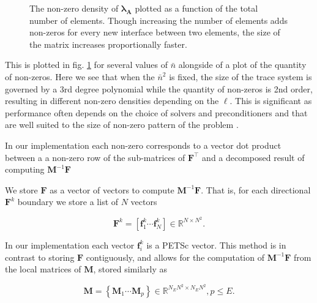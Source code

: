 \begin{figure}
	\centering
	\begin{subfigure}{\columnwidth}
		\centering
		
		
	\end{subfigure}
	\bigskip
	\begin{subfigure}{\columnwidth}
		\centering
		
	\end{subfigure}
	\caption{The non-zero density of $\symbf{\lambda}_{\textbf{A}}$ 
	plotted as a function of the total number of elements. Though increasing the number of elements adds non-zeros for every new interface between two elements, the size of the matrix increases proportionally faster.}
	\label{fig:nz_density} 
\end{figure}

\noindent
This is plotted in fig. \ref{fig:nz_density} for several values of $\bar{n}$ alongside of a plot of the quantity of non-zeros. Here we see that when the $\bar{n}^2$ is fixed, the size of the trace system is governed by a 3rd degree polynomial while the quantity of non-zeros is 2nd order, resulting in different non-zero densities depending on the $\ell$. This is significant as performance often depends on the choice of solvers and preconditioners and that are well suited to the size of non-zero pattern of the problem \citep{bollhofer2020state}. %

In our implementation each non-zero corresponds to a vector dot product between a a non-zero row of the sub-matrices of $\textbf{F}^{\intercal}$ and a decomposed result of computing  $\textbf{M}^{-1}\textbf{F}$

\noindent
We store $\textbf{F}$ as a vector of vectors to compute $\textbf{M}^{-1}\textbf{F}$. That is, for each directional $\textbf{F}^k$ boundary we store a list of $N$ vectors

\begin{equation}
	\textbf{F}^k = \left[\textbf{f}^k_1 \cdots \textbf{f}^k_N\right] \in \mathbb{R}^{N \times N^2}.
\end{equation} 

\noindent
In our implementation each vector $\textbf{f}^k_i$ is a PETSc vector. This method is in contrast to storing $\textbf{F}$ contiguously, and allows for the computation of $\textbf{M}^{-1}\textbf{F}$ from the local matrices of $\textbf{M}$, stored similarly as

\begin{equation}
	\textbf{M} = \left\{\textbf{M}_1 \cdots \textbf{M}_p\right\} \in \mathbb{R}^{N_{E}N^2 \times N_{E}N^2}, p \leq E.
\end{equation} 

